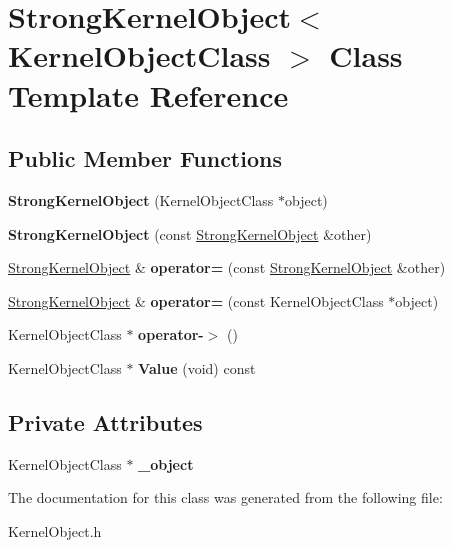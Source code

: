 \hypertarget{class_strong_kernel_object}{}\section{Strong\+Kernel\+Object$<$ Kernel\+Object\+Class $>$ Class Template Reference}
\label{class_strong_kernel_object}
\subsection*{Public Member Functions}
\begin{DoxyCompactItemize}
\item 
\mbox{\label{class_strong_kernel_object_af1344384f49b78ae614f28702a915e78}} 
{\bfseries Strong\+Kernel\+Object} (Kernel\+Object\+Class $\ast$object)
\item 
\mbox{\label{class_strong_kernel_object_a6b3233854362a6724737cd02bc54898b}} 
{\bfseries Strong\+Kernel\+Object} (const \hyperlink{class_strong_kernel_object}{Strong\+Kernel\+Object} \&other)
\item 
\mbox{\label{class_strong_kernel_object_a5b2855e2eab0f6c175b2c5e561275d06}} 
\hyperlink{class_strong_kernel_object}{Strong\+Kernel\+Object} \& {\bfseries operator=} (const \hyperlink{class_strong_kernel_object}{Strong\+Kernel\+Object} \&other)
\item 
\mbox{\label{class_strong_kernel_object_a8def94f36d2c1ae18b286de085720ef4}} 
\hyperlink{class_strong_kernel_object}{Strong\+Kernel\+Object} \& {\bfseries operator=} (const Kernel\+Object\+Class $\ast$object)
\item 
\mbox{\label{class_strong_kernel_object_a9880802d4d7bb86245318586d798714e}} 
Kernel\+Object\+Class $\ast$ {\bfseries operator-\/$>$} ()
\item 
\mbox{\label{class_strong_kernel_object_a715c9fb2499897ace11e922fbd403a75}} 
Kernel\+Object\+Class $\ast$ {\bfseries Value} (void) const
\end{DoxyCompactItemize}
\subsection*{Private Attributes}
\begin{DoxyCompactItemize}
\item 
\mbox{\label{class_strong_kernel_object_a3ca82a2e36fdbb7ec201bb202905a626}} 
Kernel\+Object\+Class $\ast$ {\bfseries \+\_\+object}
\end{DoxyCompactItemize}


The documentation for this class was generated from the following file\+:\begin{DoxyCompactItemize}
\item 
Kernel\+Object.\+h\end{DoxyCompactItemize}

